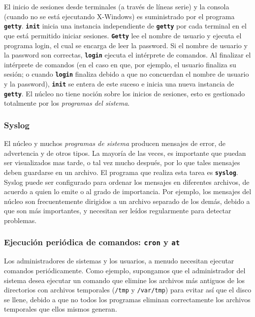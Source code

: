  El inicio de sesiones desde terminales (a través de líneas serie) y la
consola (cuando no se está ejecutando X-Windows) es suministrado por el programa
\texttt{\textbf{getty}}. \texttt{\textbf{init}} inicia una instancia
independiente de \texttt{\textbf{getty}} por cada terminal en el que está permitido iniciar
sesiones. \texttt{\textbf{Getty}} lee el nombre de usuario y ejecuta el
programa login, el cual se encarga de leer la password. Si el nombre de usuario
y la password son correctas, \texttt{\textbf{login}} ejecuta el intérprete de
comandos.  Al finalizar el intérprete de comandos (en el caso en que, por
ejemplo, el usuario finaliza su sesión; o cuando \texttt{\textbf{login}} finaliza debido a que no
concuerdan el nombre de usuario y la password), \texttt{\textbf{init}} se
entera de este suceso e inicia una nueva instancia de \texttt{\textbf{getty}}.
El núcleo no tiene noción sobre los inicios de sesiones, esto es gestionado
totalmente por los \textit{programas del sistema}.  



\subsubsection{ Syslog}

 El núcleo y muchos \textit{programas de sistema} producen
mensajes de error, de advertencia y de otros tipos. La mayoría de las veces, es
importante que puedan ser visualizados mas tarde, o tal vez mucho después, por
lo que tales mensajes deben guardarse en un archivo. El programa que realiza
esta tarea es \texttt{\textbf{syslog}}. Syslog puede ser configurado para
ordenar los mensajes en diferentes archivos, de acuerdo a quien lo emite o al
grado de importancia.  Por ejemplo, los mensajes del núcleo son frecuentemente
dirigidos a un archivo separado de los demás, debido a que son más importantes,
y necesitan ser leídos regularmente para detectar problemas.  



\subsubsection{ Ejecución periódica de comandos: \texttt{\textbf{cron}} y
\texttt{\textbf{at}}}

 Los administradores de sistemas y los usuarios, a menudo necesitan
ejecutar comandos periódicamente. Como ejemplo, supongamos que el administrador
del sistema desea ejecutar un comando que elimine los archivos más antiguos de
los directorios con archivos temporales (\texttt{/tmp} y
\texttt{/var/tmp}) para evitar así que el disco se llene, debido a
que no todos los programas eliminan correctamente los archivos temporales que
ellos mismos generan.  

